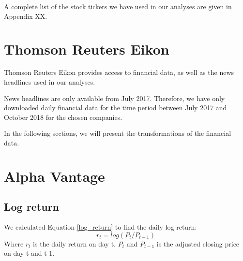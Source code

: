 \begin{table}[]
\centering
{}
\end{table}


A complete list of the stock tickers we have used in our analyses are given in Appendix XX.

\section{Thomson Reuters Eikon}
Thomson Reuters Eikon provides access to financial data, as well as the news headlines used in our analyses.  

News headlines are only available from July 2017. Therefore, we have only downloaded daily financial data for the time period between July 2017 and October 2018 for the chosen companies. 

In the following sections, we will present the transformations of the financial data. 
\section{Alpha Vantage}
\subsection{Log return}
We calculated Equation \eqref{log_return} to find the daily log return:
\begin{equation}
   \label{log_return} 
   r_t = log (P_t/P_{t-1}) 
\end{equation}
Where $r_t$ is the daily return on day t. $P_t$ and  $P_{t-1}$ is the adjusted closing price on day t and t-1. 

